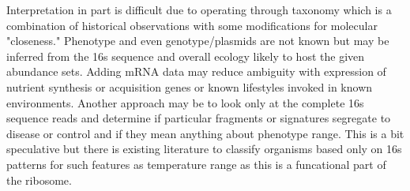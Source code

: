 \documentclass[aps,secnumarabic,balancelastpage,amsmath,amssymb,nofootinbib]{revtex4}
\begin{document}
Interpretation in part is difficult due to operating through
taxonomy which is a combination of historical observations 
with some modifications for molecular "closeness."  Phenotype
and even genotype/plasmids  are not known but may be inferred from the
16s sequence and overall ecology likely to host the given
abundance sets. Adding mRNA data  may reduce ambiguity with
expression of nutrient synthesis or acquisition genes or known
lifestyles invoked in known environments. Another approach
may be to look only at the complete 16s sequence reads and
determine if particular fragments or signatures segregate to disease or
control and if they mean anything about phenotype range. 
This is a bit speculative but there is existing literature to
classify organisms based only on 16s patterns
for such features as temperature range \cite{PMC93692} as
this is a funcational part of the ribosome.  


\begin{comment}
In previous work, I had motivated the idea that many
afflictions of old age are the result of nutrient deficiencies largely
due to GI problems which are often ignored. Much of this argument
was made in a response to \mjmdisease which continues to
be most severe in the elderly and recently described
as specifically the frail elderly or those most resembling
the picture of classic starvation.
Alzheimer's disease remains as an outstanding age-correlated disease.
While some drug approvals have been predicated on amyloid beta
removal, current trial performance is limited and real-world
experience unclear. A recent work describing the microbiome of
postmortem brain samples distinguished by AD status highlighted
organisms with known relationships to ambient tryptophan, tyrosine or
metabolites such as serotonin or benzene derivatives. 

The ability to do "clean" experiments on biological entities
is largely an illustion. However, even ambiguous data have value
if they are analyzed that way. Correlations may be useful but
any intervention is predicated on some caisality even
if that is never entirely elucidated or even stated.
And of course they fail due to only an imaginary re3ationship.

Microbiomes would unlikely be considered  clean or simple
experiments but given enough organism abundances, and knowledge
of organism lifestyle, some inferences may be made about importat
states or ecology that may not be obvious a priori or compelling
enough to do tests for specific metabolites. Genotypes as
reflected in 16s rRNA and perhaps phenotypes as reflected in 
mRNA sequencing may be good open ended tests but yield in
essence "transform data" similar to say fourier or other techniques.

Some recent work on miRNA pointed to a causal role for MEG3
in neuron loss in AD patients prompting the addition of another
target to attack. However, there is some indication even this
may reflect Trp limitations. 
  

\end{comment}
\end{document}
